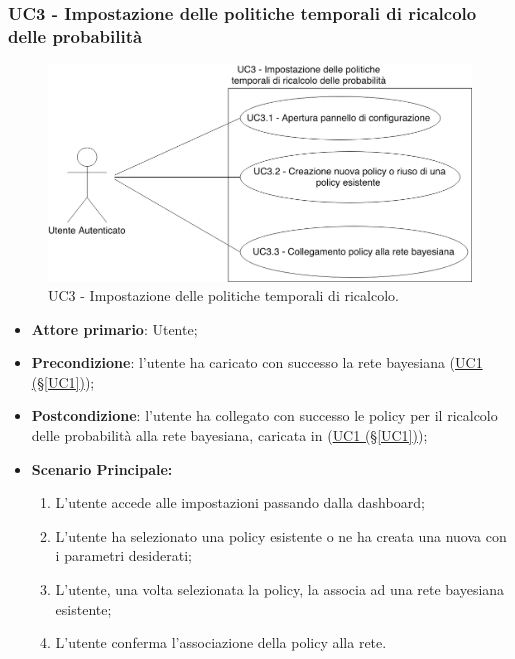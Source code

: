 \subsubsection{UC3 - Impostazione delle politiche temporali di ricalcolo delle probabilità}\label{UC3}

\begin{figure}[H]
\centering
\includegraphics[scale=0.3]{./images/UC3.png}
\caption{UC3 - Impostazione delle politiche temporali di ricalcolo.}
\end{figure}

\begin{itemize}
	\item \textbf{Attore primario}: Utente; 
	\item \textbf{Precondizione}: l'utente ha caricato con successo la rete bayesiana (\hyperref[UC1]{UC1 (§\ref*{UC1})});
	\item \textbf{Postcondizione}: l'utente ha collegato con successo le policy per il ricalcolo delle probabilità alla rete bayesiana, caricata in (\hyperref[UC1]{UC1 (§\ref*{UC1})});	
	\item \textbf{Scenario Principale:}

	\begin{enumerate}
		\item L'utente accede alle impostazioni passando dalla dashboard;
		\item L'utente ha selezionato una policy esistente o ne ha creata una nuova con i parametri desiderati; 
		\item L'utente, una volta selezionata la policy, la associa  ad una rete bayesiana esistente;
		\item L'utente conferma l'associazione della policy alla rete.
	\end{enumerate}
	
\end{itemize}

